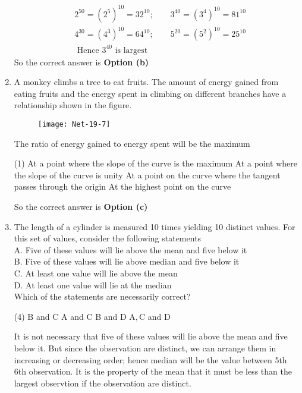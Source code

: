 \begin{enumerate}
\begin{answer}
\begin{align*}
	&2^{50}=\left(2^{5}\right)^{10}=32^{10} ; \qquad 3^{40}=\left(3^{4}\right)^{10}=81^{10}\\
	&4^{30}=\left(4^{3}\right)^{10}=64^{10} ; \qquad 5^{20}=\left(5^{2}\right)^{10}=25^{10}\\
	&\text { Hence } 3^{40} \text { is largest }
	\end{align*}
		So the correct answer is \textbf{Option (b)}
\end{answer}
\item  A monkey climbs a tree to eat fruits. The amount of energy gained from eating fruits and the energy spent in climbing on different branches have a relationship shown in the figure.
\begin{figure}[H]
	\centering
	\texttt{[image: Net-19-7]}
\end{figure}
The ratio of energy gained to energy spent will be the maximum
 \begin{tasks}(1)
	\task[\textbf{a.}] At a point where the slope of the curve is the maximum
	\task[\textbf{b.}] At a point where the slope of the curve is unity
	\task[\textbf{c.}]At a point on the curve where the tangent passes through the origin
	\task[\textbf{d.}] At the highest point on the curve
\end{tasks}
\begin{answer}
	So the correct answer is \textbf{Option (c)}
\end{answer}
\item  The length of a cylinder is measured 10 times yielding 10 distinct values. For this set of values, consider the following statements\\
A. Five of these values will lie above the mean and five below it\\
B. Five of these values will lie above median and five below it\\
C. At least one value will lie above the mean\\
D. At least one value will lie at the median\\
Which of the statements are necessarily correct?
 \begin{tasks}(4)
	\task[\textbf{a.}] $\mathrm{B}$ and $\mathrm{C}$
	\task[\textbf{b.}] $\mathrm{A}$ and $\mathrm{C}$
	\task[\textbf{c.}] B and D
	\task[\textbf{d.}]$\mathrm{A}, \mathrm{C}$ and $\mathrm{D}$ 
\end{tasks}
\begin{answer}
	It is not necessary that five of these values will lie above the mean and five below it. But since the observation  are distinct, we can arrange them in increasing or decreasing order; hence median will be the value between 5th 6th observation. It is the property of the mean that it must be less than the largest observtion if the observation are distinct.\\

\end{answer}
\end{enumerate}
